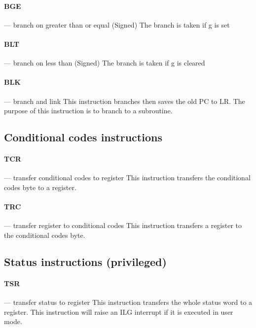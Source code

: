 \documentclass[11pt]{article}
\begin{document}
\paragraph{BGE} --- branch on greater than or equal (Signed)\newline
The branch is taken if g is set

\paragraph{BLT} --- branch on less than (Signed)\newline
The branch is taken if g is cleared

\paragraph{BLK} --- branch and link\newline
This instruction branches then saves the old PC to LR. \newline
The purpose of this instruction is to branch to a subroutine. 

\subsection{Conditional codes instructions}

\paragraph{TCR} --- transfer conditional codes to register\newline
This instruction transfers the conditional codes byte to a register. \newline

\paragraph{TRC} --- transfer register to conditional codes\newline
This instruction transfers a register to the conditional codes byte. \newline

\subsection{Status instructions (privileged)}

\paragraph{TSR} --- transfer status to register\newline
This instruction transfers the whole status word to a register. \newline
This instruction will raise an ILG interrupt if it is executed in user mode.
\end{document}
